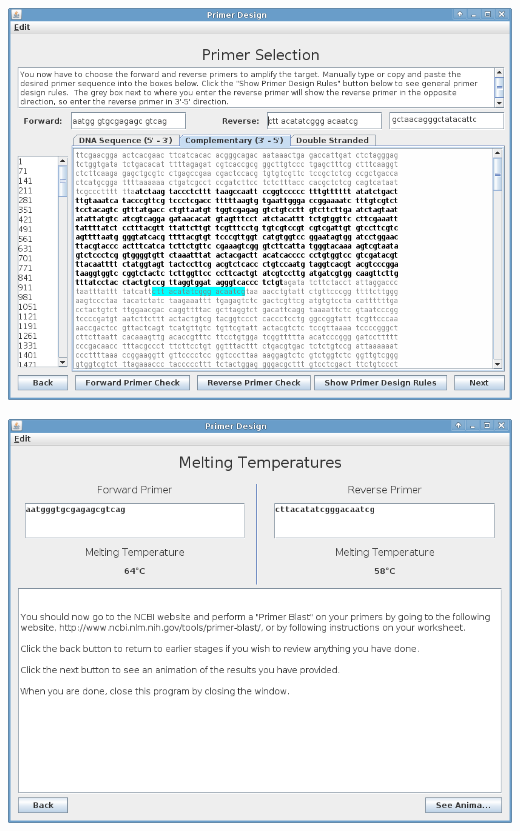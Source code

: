 \begin{frame}
  \includegraphics[width=\textwidth]
  {./img/currentBuild/reversePrimerPerfect.png}
\end{frame}

\begin{frame}
    \includegraphics[width=\textwidth]
  {./img/currentBuild/meltingTemp.png}
\end{frame}